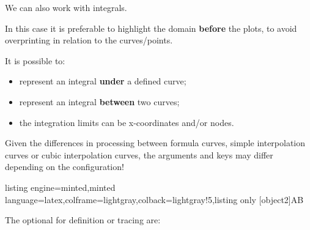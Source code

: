 \documentclass[11pt,a4paper]{ltxdoc}
\begin{document}
We can also work with integrals.

In this case it is preferable to highlight the domain \textbf{before} the plots, to avoid overprinting in relation to the curves/points.

\smallskip

It is possible to:

\begin{itemize}
	\item represent an integral \textbf{under} a defined curve;
	\item represent an integral \textbf{between} two curves;
	\item the integration limits can be x-coordinates and/or nodes.
\end{itemize}

\smallskip

{\small\faBomb} Given the differences in processing between formula curves, simple interpolation curves or cubic interpolation curves, the arguments and keys may differ depending on the configuration!

\begin{tcblisting}{listing engine=minted,minted language=latex,colframe=lightgray,colback=lightgray!5,listing only}
[object2]{A}{B}
\end{tcblisting}

The optional \MontreCode{[keys]} for definition or tracing are:
\end{document}
